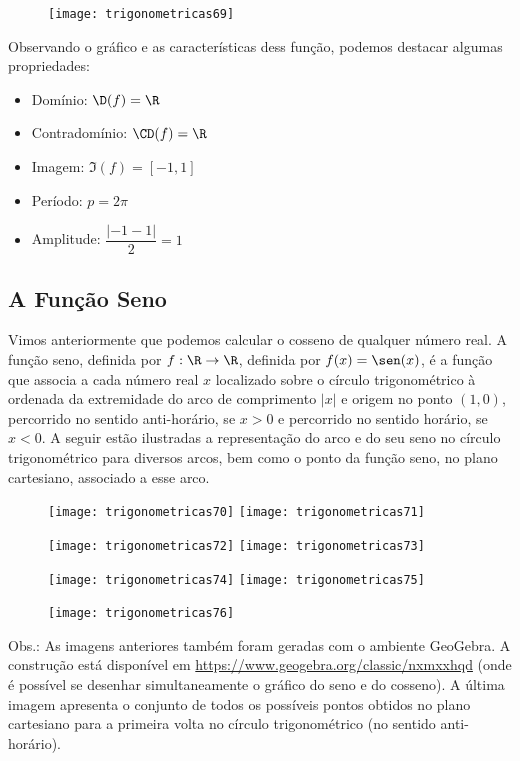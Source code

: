 \begin{figure}[H]
\centering

\texttt{[image: trigonometricas69]}
\end{figure}

Observando o gráfico e as características dess função, podemos destacar algumas propriedades:
\begin{itemize}
\item Domínio: $\D(f)=\R$
\item Contradomínio: $\CD(f)=\R$
\item Imagem: $\Im(f)=[-1,1]$
\item Período: $p=2\pi$
\item Amplitude: $\dfrac{|-1-1|}{2}=1$
\end{itemize}

\subsection{A Função Seno}


Vimos anteriormente que podemos calcular o cosseno de qualquer número real. A função seno, definida por $f:\R\to \R$, definida por $f(x)=\sen(x)$, é a função que associa a cada número real $x$ localizado sobre o círculo trigonométrico à ordenada da extremidade do arco de comprimento $|x|$ e origem no ponto $(1,0)$, percorrido no sentido anti-horário, se $x>0$ e percorrido no sentido horário, se $x<0$. A seguir estão ilustradas a representação do arco e do seu seno no círculo trigonométrico para diversos arcos, bem como o ponto da função seno, no plano cartesiano, associado a esse arco.

\begin{figure}[H]
\centering

\texttt{[image: trigonometricas70]}
\texttt{[image: trigonometricas71]}

\texttt{[image: trigonometricas72]}
\texttt{[image: trigonometricas73]}

\texttt{[image: trigonometricas74]}
\texttt{[image: trigonometricas75]}

\end{figure}

\begin{figure}[H]
\centering

\texttt{[image: trigonometricas76]}
\end{figure}


Obs.: As imagens anteriores também foram geradas com o ambiente GeoGebra. A construção está disponível em \url{https://www.geogebra.org/classic/nxmxxhqd} (onde é possível se desenhar simultaneamente o gráfico do seno e do cosseno). A última imagem apresenta o conjunto de todos os possíveis pontos obtidos no plano cartesiano para a primeira volta no círculo trigonométrico (no sentido anti-horário).

